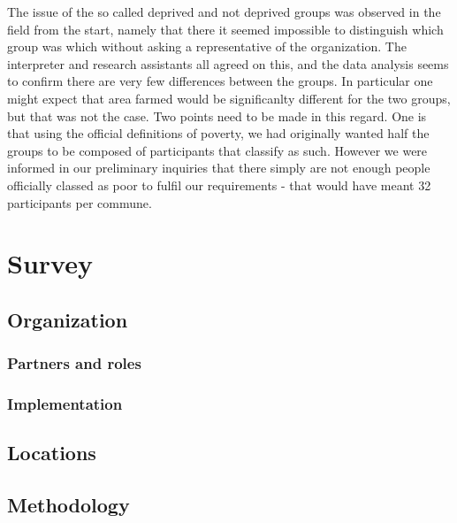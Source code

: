 \documentclass[]{article}
\begin{document}
The issue of the so called deprived and not deprived groups was observed
in the field from the start, namely that there it seemed impossible to
distinguish which group was which without asking a representative of the
organization. The interpreter and research assistants all agreed on
this, and the data analysis seems to confirm there are very few
differences between the groups. In particular one might expect that area
farmed would be significanlty different for the two groups, but that was
not the case. Two points need to be made in this regard. One is that
using the official definitions of poverty, we had originally wanted half
the groups to be composed of participants that classify as such. However
we were informed in our preliminary inquiries that there simply are not
enough people officially classed as poor to fulfil our requirements -
that would have meant 32 participants per commune.

\hypertarget{survey}{%
\section{Survey}\label{survey}}

\hypertarget{organization-1}{%
\subsection{Organization}\label{organization-1}}

\hypertarget{partners-and-roles-1}{%
\subsubsection{Partners and roles}\label{partners-and-roles-1}}

\hypertarget{implementation-1}{%
\subsubsection{Implementation}\label{implementation-1}}

\hypertarget{locations-1}{%
\subsection{Locations}\label{locations-1}}

\hypertarget{methodology-1}{%
\subsection{Methodology}\label{methodology-1}}
\end{document}
